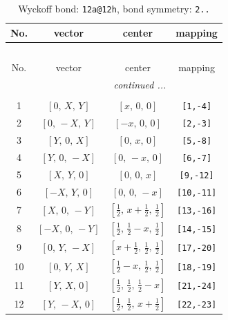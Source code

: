 \documentclass[fleqn,8pt]{jsarticle}
\begin{document}
\begin{longtable}{cccc}
\caption{Wyckoff bond: {\tt 12a@12h}, bond symmetry: {\tt 2..}}
 \\
 \hline \hline
No. & vector & center & mapping \\ \hline \endfirsthead

\multicolumn{3}{l}{\tablename\ \thetable{}} \\
 \hline \hline
No. & vector & center & mapping \\ \hline \endhead

 \hline \hline
\multicolumn{3}{r}{\footnotesize\it continued ...} \\ \endfoot

 \hline \hline
\multicolumn{3}{r}{} \\ \endlastfoot

1 & $\left[ 0,\, X,\, Y \right]$ & $\left[ x,\, 0,\, 0 \right]$ & {\tt [1,-4]} \\ \hline
2 & $\left[ 0,\, - X,\, Y \right]$ & $\left[ - x,\, 0,\, 0 \right]$ & {\tt [2,-3]} \\ \hline
3 & $\left[ Y,\, 0,\, X \right]$ & $\left[ 0,\, x,\, 0 \right]$ & {\tt [5,-8]} \\ \hline
4 & $\left[ Y,\, 0,\, - X \right]$ & $\left[ 0,\, - x,\, 0 \right]$ & {\tt [6,-7]} \\ \hline
5 & $\left[ X,\, Y,\, 0 \right]$ & $\left[ 0,\, 0,\, x \right]$ & {\tt [9,-12]} \\ \hline
6 & $\left[ - X,\, Y,\, 0 \right]$ & $\left[ 0,\, 0,\, - x \right]$ & {\tt [10,-11]} \\ \hline
7 & $\left[ X,\, 0,\, - Y \right]$ & $\left[ \frac{1}{2},\, x + \frac{1}{2},\, \frac{1}{2} \right]$ & {\tt [13,-16]} \\ \hline
8 & $\left[ - X,\, 0,\, - Y \right]$ & $\left[ \frac{1}{2},\, \frac{1}{2} - x,\, \frac{1}{2} \right]$ & {\tt [14,-15]} \\ \hline
9 & $\left[ 0,\, Y,\, - X \right]$ & $\left[ x + \frac{1}{2},\, \frac{1}{2},\, \frac{1}{2} \right]$ & {\tt [17,-20]} \\ \hline
10 & $\left[ 0,\, Y,\, X \right]$ & $\left[ \frac{1}{2} - x,\, \frac{1}{2},\, \frac{1}{2} \right]$ & {\tt [18,-19]} \\ \hline
11 & $\left[ Y,\, X,\, 0 \right]$ & $\left[ \frac{1}{2},\, \frac{1}{2},\, \frac{1}{2} - x \right]$ & {\tt [21,-24]} \\ \hline
12 & $\left[ Y,\, - X,\, 0 \right]$ & $\left[ \frac{1}{2},\, \frac{1}{2},\, x + \frac{1}{2} \right]$ & {\tt [22,-23]} \\
\end{longtable}
\end{document}
